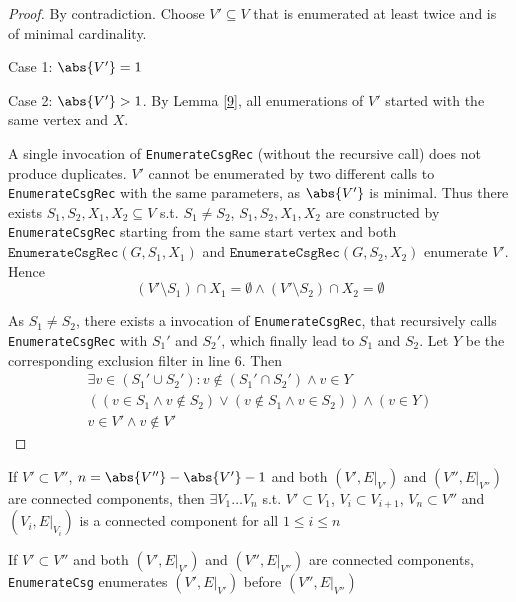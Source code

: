 \documentclass[11pt]{article}
\begin{document}
\begin{proof}
By contradiction. Choose  \(V'\subseteq V\) that is enumerated at least twice and is of minimal
cardinality.

Case 1: \(\abs{V'}=1\)

Case 2: \(\abs{V'}>1\). By Lemma \ref{9}, all enumerations of \(V'\) started with the same vertex and
\(X\).

A single invocation of \texttt{EnumerateCsgRec} (without the recursive call) does not produce duplicates.
\(V'\) cannot be enumerated by two different calls to \texttt{EnumerateCsgRec} with the same parameters, as
\(\abs{V'}\) is minimal. Thus there exists \(S_1,S_2,X_1,X_2\subseteq V\) s.t. \(S_1\neq S_2\),
\(S_1,S_2,X_1,X_2\) are constructed by \texttt{EnumerateCsgRec} starting from the same start vertex and both
\(\texttt{EnumerateCsgRec}(G,S_1,X_1)\) and \(\texttt{EnumerateCsgRec}(G,S_2,X_2)\) enumerate \(V'\).
Hence
\begin{equation*}
(V'\setminus S_1)\cap X_1=\emptyset\wedge
(V'\setminus S_2)\cap X_2=\emptyset
\end{equation*}

As \(S_1\neq S_2\), there exists a invocation of \texttt{EnumerateCsgRec}, that recursively calls
\texttt{EnumerateCsgRec} with \(S_1'\) and \(S_2'\), which finally lead to \(S_1\) and \(S_2\). Let \(Y\) be
the corresponding exclusion filter in line 6. Then
\begin{gather*}
\exists v\in (S_1'\cup S_2'):v\notin(S_1'\cap S_2')\wedge v\in Y\\
((v\in S_1\wedge v\notin S_2)\vee(v\notin S_1\wedge v\in S_2))\wedge(v\in Y)\\
v\in V'\wedge v\notin V'
\end{gather*}

\end{proof}

\begin{lemma}[]
If \(V'\subset V''\), \(n=\abs{V''}-\abs{V'}-1\) and both \((V',E|_{V'})\) and
\((V'',E|_{V''})\) are connected components, then \(\exists V_1\dots V_n\) s.t.
\(V'\subset V_1\), \(V_i\subset V_{i+1}\), \(V_n\subset V''\) and \((V_i,E|_{V_i})\) is a connected
component for all \(1\le i\le n\)
\end{lemma}

\begin{lemma}[]
\label{12}
If \(V'\subset V''\) and both \((V',E|_{V'})\) and \((V'',E|_{V''})\) are connected components,
\texttt{EnumerateCsg} enumerates \((V',E|_{V'})\) before \((V'',E|_{V''})\)
\end{lemma}
\end{document}
